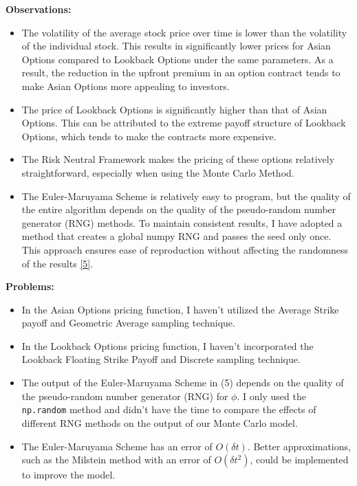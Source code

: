\documentclass[11pt]{article}
\begin{document}
    \textbf{Observations:}

\begin{itemize}
\item
  The volatility of the average stock price over time is lower than the
  volatility of the individual stock. This results in significantly
  lower prices for Asian Options compared to Lookback Options under the
  same parameters. As a result, the reduction in the upfront premium in
  an option contract tends to make Asian Options more appealing to
  investors.
\item
  The price of Lookback Options is significantly higher than that of
  Asian Options. This can be attributed to the extreme payoff structure
  of Lookback Options, which tends to make the contracts more expensive.
\item
  The Risk Neutral Framework makes the pricing of these options
  relatively straightforward, especially when using the Monte Carlo
  Method.
\item
  The Euler-Maruyama Scheme is relatively easy to program, but the
  quality of the entire algorithm depends on the quality of the
  pseudo-random number generator (RNG) methods. To maintain consistent
  results, I have adopted a method that creates a global numpy RNG and
  passes the seed only once. This approach ensures ease of reproduction
  without affecting the randomness of the results \hyperref[5]{[5]}.
\end{itemize}

    \textbf{Problems:}

\begin{itemize}
\item
  In the Asian Options pricing function, I haven't utilized the Average
  Strike payoff and Geometric Average sampling technique.
\item
  In the Lookback Options pricing function, I haven't incorporated the
  Lookback Floating Strike Payoff and Discrete sampling technique.
\item
  The output of the Euler-Maruyama Scheme in (5) depends on the quality
  of the pseudo-random number generator (RNG) for \(\phi\). I only used
  the \texttt{np.random} method and didn't have the time to compare the
  effects of different RNG methods on the output of our Monte Carlo
  model.
\item
  The Euler-Maruyama Scheme has an error of \(O(\delta t)\). Better
  approximations, such as the Milstein method with an error of
  \(O(\delta t^2)\), could be implemented to improve the model.
\end{itemize}
\end{document}
